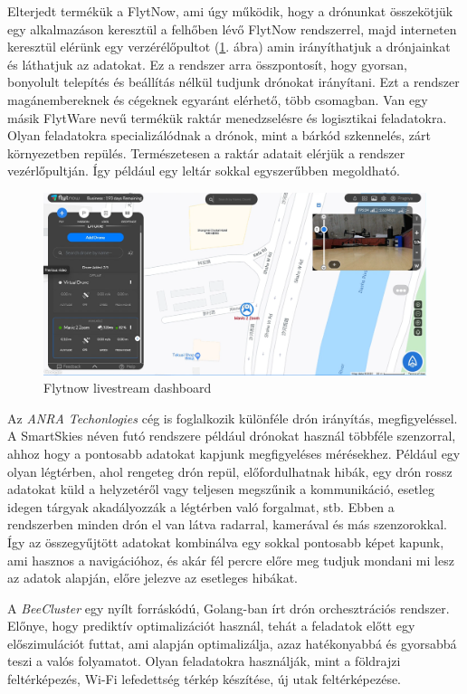 Elterjedt termékük a FlytNow, ami úgy működik, hogy a drónunkat összekötjük egy alkalmazáson keresztül a felhőben lévő FlytNow rendszerrel,
majd interneten keresztül elérünk egy verzérélőpultot (\ref{fig:flytdash}. ábra) amin irányíthatjuk a drónjainkat és láthatjuk az adatokat.
Ez a rendszer arra összpontosít, hogy gyorsan, bonyolult telepítés és beállítás nélkül tudjunk drónokat irányítani.
Ezt a rendszer magánembereknek és cégeknek egyaránt elérhető, több csomagban.
Van egy másik FlytWare nevű termékük raktár menedzselésre és logisztikai feladatokra.
Olyan feladatokra specializálódnak a drónok, mint a bárkód szkennelés, zárt környezetben repülés.
Természetesen a raktár adatait elérjük a rendszer vezérlőpultján.
Így például egy leltár sokkal egyszerűbben megoldható.


\begin{figure}[h]
    \centering
    \includegraphics[scale=0.3]{images/flyt-dashboard.png}
    \caption{Flytnow livestream dashboard \cite{flytnow_2021}}
    \label{fig:flytdash}
\end{figure}

Az \textit{ANRA Techonlogies}\cite{anra} cég is foglalkozik különféle drón irányítás, megfigyeléssel.
A SmartSkies néven futó rendszere például drónokat használ többféle szenzorral, ahhoz hogy a pontosabb adatokat kapjunk megfigyeléses mérésekhez.
Például egy olyan légtérben, ahol rengeteg drón repül, előfordulhatnak hibák, egy drón rossz adatokat küld a helyzetéről vagy teljesen megszűnik a kommunikáció, esetleg idegen tárgyak akadályozzák a légtérben  való forgalmat, stb.
Ebben a rendszerben minden drón el van látva radarral, kamerával és más szenzorokkal.
Így az összegyűjtött adatokat kombinálva egy sokkal pontosabb képet kapunk, ami hasznos a navigációhoz, és akár fél percre előre meg tudjuk mondani mi lesz az adatok alapján, előre jelezve az esetleges hibákat.


A \textit{BeeCluster}\cite{beecluster} egy nyílt forráskódú, Golang-ban írt drón orchesztrációs rendszer.
Előnye, hogy prediktív optimalizációt használ, tehát a feladatok előtt egy előszimulációt futtat, ami alapján optimalizálja, azaz hatékonyabbá és gyorsabbá teszi a valós folyamatot.
Olyan feladatokra használják, mint a földrajzi feltérképezés, Wi-Fi lefedettség térkép készítése, új utak feltérképezése.


